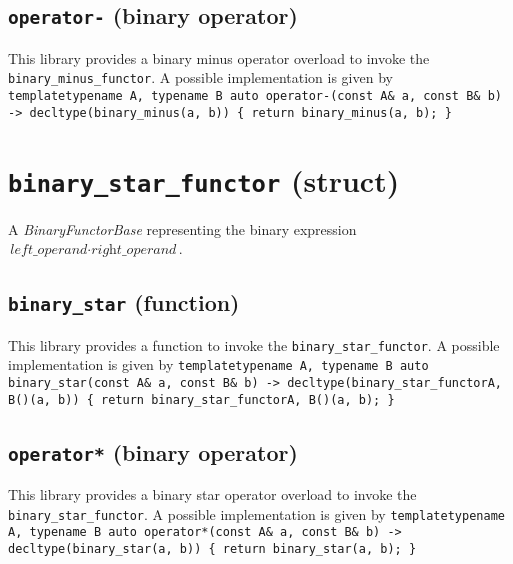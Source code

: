 \documentclass[oneside]{book}
\begin{document}
\subsection{\texttt{operator-} (binary operator)}
This library provides a binary minus operator overload to invoke the \texttt{binary\_minus\_functor}.
A possible implementation is given by\newline
\texttt{template\textlangle typename A, typename B\textrangle\newline
auto operator-(const A\& a, const B\& b) -> decltype(binary\_minus(a, b))\newline
\{ return binary\_minus(a, b); \}}

\section{\texttt{binary\_star\_functor} (struct)}
A \textit{BinaryFunctorBase} representing the binary expression $\textit{left\_operand} \cdot \textit{right\_operand}$.\newline

\subsection{\texttt{binary\_star} (function)}
This library provides a function to invoke the \texttt{binary\_star\_functor}.
A possible implementation is given by\newline
\texttt{template\textlangle typename A, typename B\textrangle\newline
auto binary\_star(const A\& a, const B\& b) -> decltype(binary\_star\_functor\textlangle A, B\textrangle()(a, b))\newline
\{ return binary\_star\_functor\textlangle A, B\textrangle()(a, b); \}}

\subsection{\texttt{operator*} (binary operator)}
This library provides a binary star operator overload to invoke the \texttt{binary\_star\_functor}.
A possible implementation is given by\newline
\texttt{template\textlangle typename A, typename B\textrangle\newline
auto operator*(const A\& a, const B\& b) -> decltype(binary\_star(a, b))\newline
\{ return binary\_star(a, b); \}}
\end{document}
